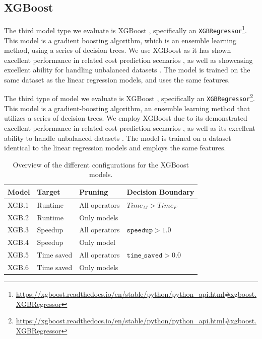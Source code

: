 \subsection{XGBoost}
\label{subsec:5-xgboost}
The third model type we evaluate is XGBoost \cite{xgboost}, specifically an \texttt{XGBRegressor}\footnote{\url{https://xgboost.readthedocs.io/en/stable/python/python_api.html\#xgboost.XGBRegressor}}. This model is a gradient boosting algorithm, which is an ensemble learning method, using a series of decision trees. We use XGBoost as it has shown excellent performance in related cost prediction scenarios \cite{tvm}, as well as showcasing excellent ability for handling unbalanced datasets \cite{xgboost_imbalanced_data}. The model is trained on the same dataset as the linear regression models, and uses the same features.

The third type of model we evaluate is XGBoost \cite{xgboost}, specifically an \texttt{XGBRegressor}\footnote{\url{https://xgboost.readthedocs.io/en/stable/python/python_api.html\#xgboost.XGBRegressor}}. This model is a gradient-boosting algorithm, an ensemble learning method that utilizes a series of decision trees. We employ XGBoost due to its demonstrated excellent performance in related cost prediction scenarios \cite{tvm}, as well as its excellent ability to handle unbalanced datasets \cite{xgboost_imbalanced_data}. The model is trained on a dataset identical to the linear regression models and employs the same features.

\begin{table}[ht]
    \centering
    \begin{tabular}{llll}
        \toprule
        Model & Target     & Pruning       & Decision Boundary            \\
        \midrule \midrule
        XGB.1 & Runtime    & All operators & $Time_M > Time_F$            \\
        XGB.2 & Runtime    & Only models   &                              \\
        XGB.3 & Speedup    & All operators & $\texttt{speedup} > 1.0$     \\
        XGB.4 & Speedup    & Only model    &                              \\
        XGB.5 & Time saved & All operators & $\texttt{time\_saved} > 0.0$ \\
        XGB.6 & Time saved & Only models   &                              \\
        \bottomrule
    \end{tabular}
    \caption[XGBoost configurations]{Overview of the different configurations for the XGBoost models.}
    \label{tab:5-xgboost-configurations}
\end{table}

